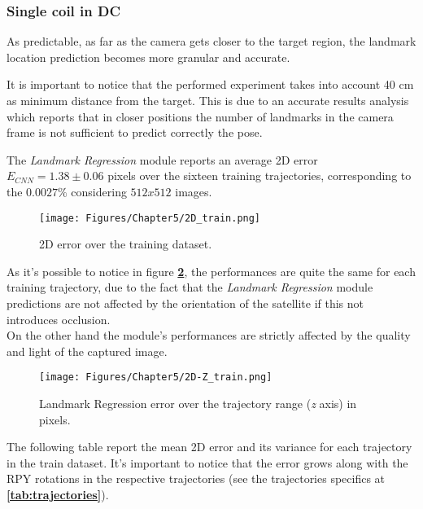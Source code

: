 \subsubsection{Single coil in DC}
As predictable, as far as the camera gets closer to the target region, the landmark location prediction becomes more granular and accurate.

It is important to notice that the performed experiment takes into account 40 cm as minimum distance from the target. This is due to an accurate results analysis which reports that in closer positions the number of landmarks in the camera frame is not sufficient to predict correctly the pose.

The \textit{Landmark Regression} module reports an average 2D error $E_{CNN}=1.38 \pm 0.06$ pixels over the sixteen training trajectories, corresponding to the $0.0027\%$ considering $512x512$ images.
\begin{figure}[H]
    \centering
    \texttt{[image: Figures/Chapter5/2D\_train.png]}
    \caption[2D error over the training dataset.]{2D error over the training dataset.}
    \label{fig:2D Train}
\end{figure}

As it's possible to notice in figure \textbf{\ref{fig:2D-Z Train}}, the performances are quite the same for each training trajectory, due to the fact that the \textit{Landmark Regression} module predictions are not affected by the orientation of the satellite if this not introduces occlusion.\\
On the other hand the module's performances are strictly affected by the quality and light of the captured image.

\begin{figure}[H]
    \centering
    \texttt{[image: Figures/Chapter5/2D-Z\_train.png]}
    \caption[Landmark Regression error over the trajectory range.]{Landmark Regression error over the trajectory range (\textit{z} axis) in pixels.}
    \label{fig:2D-Z Train}
\end{figure}

\newpage
The following table report the mean 2D error and its variance for each trajectory in the train dataset. It's important to notice that the error grows along with the RPY rotations in the respective trajectories (see the trajectories specifics at \textbf{\ref{tab:trajectories}}).

